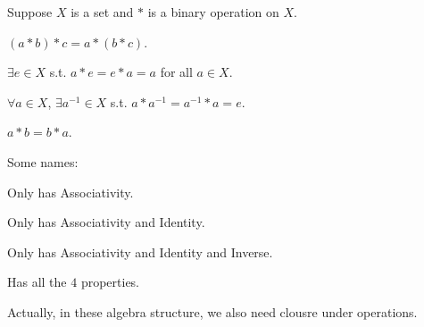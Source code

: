 \begin{definition*}
    Suppose \(X\) is a set and \(*\) is a binary operation on \(X\). 
    \begin{definition}[Associativity]
        \((a * b) * c = a * (b *c)\). 
    \end{definition}  
    \begin{definition}[Identity]
        \(\exists e \in X\) s.t. \(a * e = e * a = a\) for all \(a \in X\).   
    \end{definition} 
    \begin{definition}[Inverse]
        \(\forall a \in X\), \(\exists a^{-1} \in X\) s.t. \(a * a^{-1} = a^{-1} * a = e\).   
    \end{definition}
    \begin{definition}[Commutativity]
        \(a * b = b * a\). 
    \end{definition}
\end{definition*}

\begin{definition}
    Some names:
    \begin{definition}[Semigroup]
        Only has Associativity.
    \end{definition}
    \begin{definition}[Monoid]
        Only has Associativity and Identity.
    \end{definition}
    \begin{definition}[Group]
        Only has Associativity and Identity and Inverse.
    \end{definition}
    \begin{definition}
       Has all the \(4\) properties.  
    \end{definition}
\end{definition}

\begin{note}
    Actually, in these algebra structure, we also need clousre under operations.
\end{note}